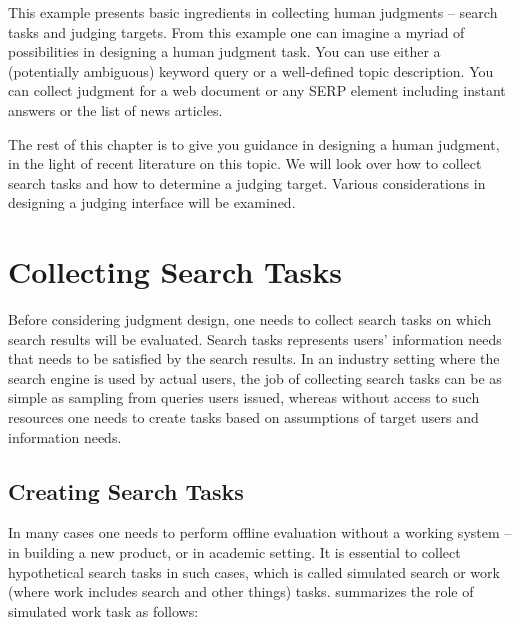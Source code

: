 \documentclass[openany]{now} %
\begin{document}
This example presents basic ingredients in collecting human judgments -- search tasks and judging targets. From this example one can imagine a myriad of possibilities in designing a human judgment task. You can use either a (potentially ambiguous) keyword query or a well-defined topic description. You can collect judgment for a web document or any SERP element including instant answers or the list of news articles. 

The rest of this chapter is to give you guidance in designing a human judgment, in the light of recent literature on this topic. We will look over how to collect search tasks and how to determine a judging target. Various considerations in designing a judging interface will be examined. %



\section{Collecting Search Tasks}
Before considering judgment design, one needs to collect search tasks on which search results will be evaluated. Search tasks represents users' information needs that needs to be satisfied by the search results. In an industry setting where the search engine is used by actual users, the job of collecting search tasks can be as simple as sampling from queries users issued, whereas without access to such resources one needs to create tasks based on assumptions of target users and information needs. 

\subsection{Creating Search Tasks}
In many cases one needs to perform offline evaluation without a working system -- in building a new product, or in academic setting. It is essential to collect hypothetical search tasks in such cases, which is called simulated search or work (where work includes search and other things) tasks. \cite{Borlund:2003} summarizes the role of  simulated work task as follows:
\end{document}
